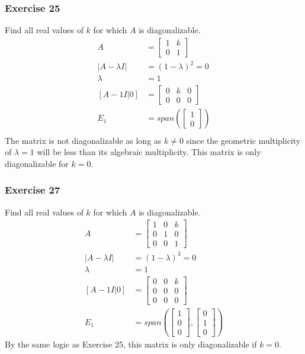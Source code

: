 \documentclass{math}
\begin{document}
\subsubsection*{Exercise 25}
Find all real values of \( k \) for which \( A \) is diagonalizable.
\begin{align*}
  A &= \begin{bmatrix}
    1 & k \\
    0 & 1
  \end{bmatrix} \\
  |A-\lambda I| &= (1-\lambda)^2 = 0 \\
  \lambda &= 1 \\
  [A-1I|0] &= \begin{bmatrix}
    0 & k & 0 \\
    0 & 0 & 0
  \end{bmatrix} \\
  E_1 &= span\left(\begin{bmatrix}1 \\ 0\end{bmatrix}\right) \\
\end{align*}
The matrix is not diagonalizable as long as \( k\ne0 \) since the geometric
multiplicity of \( \lambda = 1 \) will be less than its algebraic multiplicity.
This matrix is only diagonalizable for \( k = 0 \).

\subsubsection*{Exercise 27}
Find all real values of \( k \) for which \( A \) is diagonalizable.
\begin{align*}
  A &= \begin{bmatrix}
    1 & 0 & k \\
    0 & 1 & 0 \\
    0 & 0 & 1
  \end{bmatrix} \\
  |A-\lambda I| &= (1-\lambda)^3 = 0 \\
  \lambda &= 1 \\
  [A-1I|0] &= \begin{bmatrix}
    0 & 0 & k \\
    0 & 0 & 0 \\
    0 & 0 & 0
  \end{bmatrix} \\
  E_1 &= span\left(\begin{bmatrix}1 \\ 0 \\ 0\end{bmatrix},
    \begin{bmatrix}0 \\ 1 \\ 0\end{bmatrix}\right)
\end{align*}
By the same logic as Exercise 25, this matrix is only diagonalizable if
\( k = 0 \).
\end{document}
